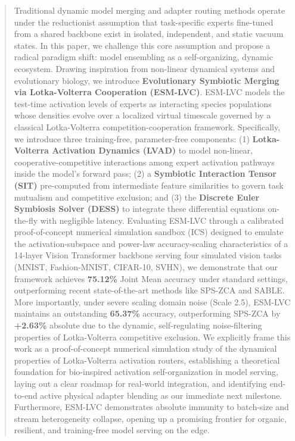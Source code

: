\begin{abstract}
Traditional dynamic model merging and adapter routing methods operate under the reductionist assumption that task-specific experts fine-tuned from a shared backbone exist in isolated, independent, and static vacuum states. 
In this paper, we challenge this core assumption and propose a radical paradigm shift: model ensembling as a self-organizing, dynamic ecosystem. 
Drawing inspiration from non-linear dynamical systems and evolutionary biology, we introduce \textbf{Evolutionary Symbiotic Merging via Lotka-Volterra Cooperation (ESM-LVC)}. 
ESM-LVC models the test-time activation levels of experts as interacting species populations whose densities evolve over a localized virtual timescale governed by a classical Lotka-Volterra competition-cooperation framework. 
Specifically, we introduce three training-free, parameter-free components:
(1) \textbf{Lotka-Volterra Activation Dynamics (LVAD)} to model non-linear, cooperative-competitive interactions among expert activation pathways inside the model's forward pass;
(2) a \textbf{Symbiotic Interaction Tensor (SIT)} pre-computed from intermediate feature similarities to govern task mutualism and competitive exclusion; and
(3) the \textbf{Discrete Euler Symbiosis Solver (DESS)} to integrate these differential equations on-the-fly with negligible latency.
Evaluating ESM-LVC through a calibrated proof-of-concept numerical simulation sandbox (ICS) designed to emulate the activation-subspace and power-law accuracy-scaling characteristics of a 14-layer Vision Transformer backbone serving four simulated vision tasks (MNIST, Fashion-MNIST, CIFAR-10, SVHN), we demonstrate that our framework achieves \textbf{75.12\%} Joint Mean accuracy under standard settings, outperforming recent state-of-the-art methods like SPS-ZCA and SABLE. 
More importantly, under severe scaling domain noise (Scale 2.5), ESM-LVC maintains an outstanding \textbf{65.37\%} accuracy, outperforming SPS-ZCA by \textbf{+2.63\%} absolute due to the dynamic, self-regulating noise-filtering properties of Lotka-Volterra competitive exclusion. 
We explicitly frame this work as a proof-of-concept numerical simulation study of the dynamical properties of Lotka-Volterra activation routers, establishing a theoretical foundation for bio-inspired activation self-organization in model serving, laying out a clear roadmap for real-world integration, and identifying end-to-end active physical adapter blending as our immediate next milestone.
Furthermore, ESM-LVC demonstrates absolute immunity to batch-size and stream heterogeneity collapse, opening up a promising frontier for organic, resilient, and training-free model serving on the edge.
\end{abstract}
